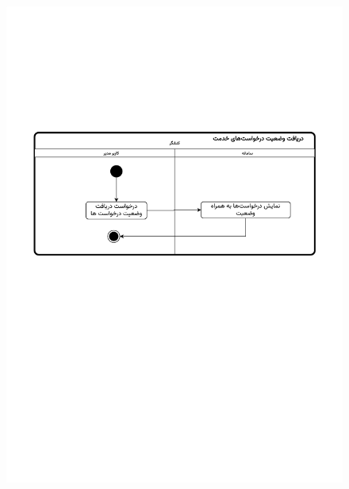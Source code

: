 \begin{figure}[ht!]
	\centering
	\includegraphics[scale=0.8, page=1]{figs/OOD-activity-vaziatreq.pdf}
\end{figure}
\FloatBarrier
\newpage

